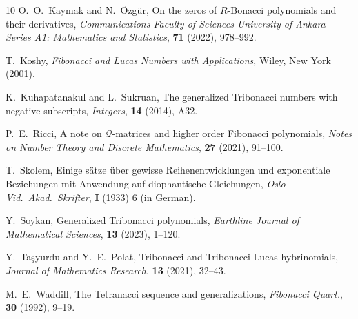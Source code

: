 \documentclass[review]{elsarticle}
\theoremstyle{plain}
\begin{document}
\begin{thebibliography}{10}
O.~O.~Kaymak and N.~{\"O}zg{\"u}r,
On the zeros of $R$-Bonacci polynomials and their derivatives,
\textit{Communications Faculty of Sciences University of Ankara Series A1: Mathematics and Statistics}, \textbf{71} (2022), 978--992.

T.~Koshy, 
\textit{Fibonacci and Lucas Numbers with Applications}, 
Wiley, New York (2001).

K.~Kuhapatanakul and L.~Sukruan,
The generalized Tribonacci numbers with negative subscripts,
\textit{Integers}, \textbf{14} (2014), A32.

P.~E.~Ricci,
A note on $\mathcal{Q}$-matrices and higher order Fibonacci polynomials,
\textit{Notes on Number Theory and Discrete Mathematics}, \textbf{27} (2021), 91--100.

T.~Skolem,
Einige s{\"a}tze {\"u}ber gewisse Reihenentwicklungen und exponentiale Beziehungen mit Anwendung auf diophantische Gleichungen,
\textit{Oslo Vid.~Akad.~Skrifter}, \textbf{I} (1933) 6 (in German).

Y.~Soykan,
Generalized Tribonacci polynomials,
\textit{Earthline Journal of Mathematical Sciences}, \textbf{13} (2023), 1--120.
  
Y.~Ta{\c s}yurdu and Y.~E.~Polat,
Tribonacci and Tribonacci-Lucas hybrinomials,
\textit{Journal of Mathematics Research}, \textbf{13} (2021), 32--43.

M.~E.~Waddill,
The Tetranacci sequence and generalizations,
\textit{Fibonacci Quart.}, \textbf{30} (1992), 9--19.
  
\end{thebibliography}
\end{document}
